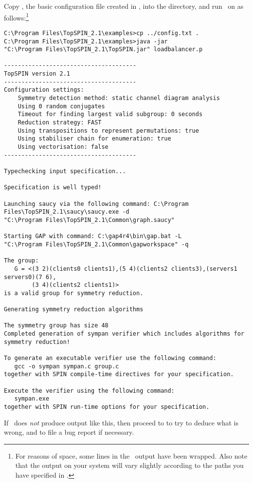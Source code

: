 Copy , the basic configuration file created in
, into the  directory,
and run \topspin\ on  as
follows:\footnote{For reasons of space, some lines in the \topspin\
output have been wrapped. Also note that the output on your system
will vary slightly according to the paths you have specified in
.}
%
\begin{lstlisting}
C:\Program Files\TopSPIN_2.1\examples>cp ../config.txt .
C:\Program Files\TopSPIN_2.1\examples>java -jar
"C:\Program Files\TopSPIN_2.1\TopSPIN.jar" loadbalancer.p

--------------------------------------
TopSPIN version 2.1
--------------------------------------
Configuration settings:
    Symmetry detection method: static channel diagram analysis
    Using 0 random conjugates
    Timeout for finding largest valid subgroup: 0 seconds
    Reduction strategy: FAST
    Using transpositions to represent permutations: true
    Using stabiliser chain for enumeration: true
    Using vectorisation: false
--------------------------------------

Typechecking input specification...

Specification is well typed!

Launching saucy via the following command: C:\Program Files\TopSPIN_2.1\saucy\saucy.exe -d
"C:\Program Files\TopSPIN_2.1\Common\graph.saucy"

Starting GAP with command: C:\gap4r4\bin\gap.bat -L
"C:\Program Files\TopSPIN_2.1\Common\gapworkspace" -q

The group:
   G = <(3 2)(clients0 clients1),(5 4)(clients2 clients3),(servers1 servers0)(7 6),
        (3 4)(clients2 clients1)>
is a valid group for symmetry reduction.

Generating symmetry reduction algorithms

The symmetry group has size 48
Completed generation of sympan verifier which includes algorithms for symmetry reduction!

To generate an executable verifier use the following command:
   gcc -o sympan sympan.c group.c
together with SPIN compile-time directives for your specification.

Execute the verifier using the following command:
   sympan.exe
together with SPIN run-time options for your specification.
\end{lstlisting}
%
If \topspin\ does \emph{not} produce output like this, then proceed
to \chapref{troubleshooting} to try to deduce what is wrong, and to
file a bug report if necessary.

